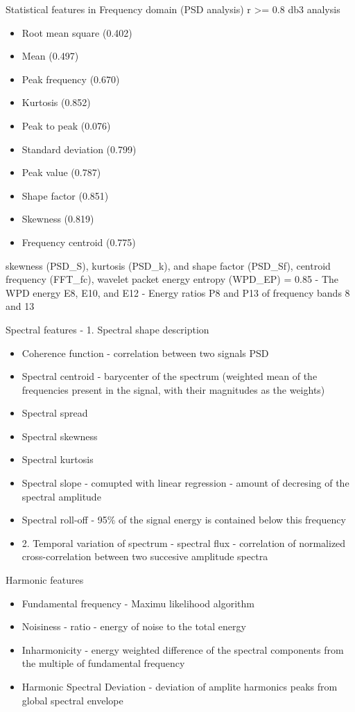 Statistical features in Frequency domain (PSD analysis) r >= 0.8 db3 analysis
\begin{itemize}
	\item 	Root mean square (0.402)
	\item Mean (0.497)
	\item Peak frequency (0.670)
	\item Kurtosis (0.852)
	\item Peak to peak (0.076)
	\item Standard deviation (0.799)
	\item Peak value (0.787)
	\item Shape factor (0.851)
	\item Skewness (0.819)
	\item Frequency centroid (0.775)
\end{itemize}
skewness (PSD\_S), kurtosis (PSD\_k), and shape factor (PSD\_Sf),
centroid frequency (FFT\_fc), wavelet packet energy entropy (WPD\_EP) = 0.85
- The WPD energy E8, E10, and E12
- Energy ratios P8 and P13 of frequency bands 8 and 13

Spectral features \cite{peeters_large_2004} - 1. Spectral shape description
\begin{itemize}
\item Coherence function - correlation between two signals PSD
\item  Spectral centroid - barycenter of the spectrum (weighted mean of the frequencies present in the signal, with their magnitudes as the weights)
\item Spectral spread
\item Spectral skewness
\item Spectral kurtosis
\item Spectral slope - comupted with linear regression - amount of decresing of the spectral amplitude
\item Spectral roll-off - 95\% of the signal energy is contained below this frequency
\item 2. Temporal variation of spectrum - spectral flux - correlation of normalized cross-correlation between two succesive amplitude spectra
\end{itemize}

Harmonic features
\begin{itemize}
\item Fundamental frequency  - Maximu likelihood algorithm
\item Noisiness - ratio - energy of noise to the total energy
\item Inharmonicity - energy weighted difference of the spectral components from the multiple of fundamental frequency
\item Harmonic Spectral Deviation - deviation of amplite harmonics peaks from global spectral envelope
\end{itemize}



